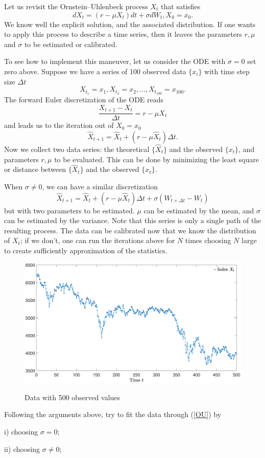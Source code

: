     \problem
    \begin{question}
        Let us revisit the Ornstein--Uhlenbeck process $X_t$ that satisfies
        \begin{equation}\label{OU}
        dX_t=(r-\mu X_t)dt+\sigma dW_t,X_0=x_0.
        \end{equation}
        We know well the explicit solution, and the associated distribution.  If one wants to apply this process to describe a time series, then it leaves the parameters $r,\mu$ and $\sigma$ to be estimated or calibrated.

        To see how to implement this maneuver, let us consider the ODE with $\sigma=0$ set zero above.  Suppose we have a series of 100 observed data $\{x_i\}$ with time step size $\Delta t$
        \[X_{t_1}=x_1,X_{t_2}=x_2,...,X_{t_{100}}=x_{100}.\]
        The forward Euler discretization of the ODE reads
        \[\frac{X_{t+1}-X_{t}}{\Delta t}=r-\mu X_{t}\]
        and leads us to the iteration out of $X_0=x_0$
        \[\hat X_{t+1}=\hat X_{t}+(r-\mu \hat X_{t})\Delta t.\]
        Now we collect two data series: the theoretical $\{\hat X_t\}$ and the observed $\{x_{t}\}$, and parameters $r,\mu$ to be evaluated.  This can be done by minimizing the least square or distance between $\{\hat X_t\}$ and the observed $\{x_{t}\}$.

        When $\sigma\neq0$, we can have a similar discretization
        \[\hat X_{t+1}=\hat X_{t}+(r-\mu \hat X_{t})\Delta t+\sigma (W_{t+\Delta t}-W_t)\]
        but with two parameters to be estimated.  $\mu$ can be estimated by the mean, and $\sigma$ can be estimated by the variance.  Note that this series is only a single path of the resulting process.  The data can be calibrated now that we know the distribution of $X_t$; if we don't, one can run the iterations above for $N$ times choosing $N$ large to create sufficiently approximation of the statistics.
        \begin{figure}[h!]
        \centering
        \includegraphics[width=1\textwidth]{data.eps}\\
        \caption{Data with 500 observed values}\label{data}
        \end{figure}

        Following the arguments above, try to fit the data through (\ref{OU}) by 

        i) choosing $\sigma=0$;

        ii) choosing $\sigma\neq0$;
    \end{question}
